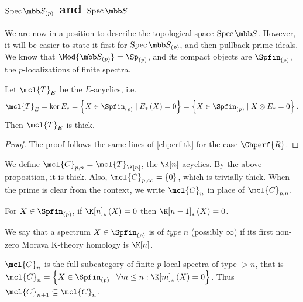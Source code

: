 \subsection{\texorpdfstring{$\spec \SS_{\left(p\right)}$}{spec S(p)} and \texorpdfstring{$\spec \SS$}{spec S}}

We are now in a position to describe the topological space $\spec \SS$.
However, it will be easier to state it first for $\spec \SS_{\left(p\right)}$, and then pullback prime ideals.
We know that $\Mod{\SS_{\left(p\right)}} = \Sp_{\left(p\right)}$, and its compact objects are $\Spfin_{\left(p\right)}$, the $p$-localizations of finite spectra.

\begin{proposition}
	Let $\mcl{T}_E$ be the $E$-acyclics, i.e.
	$$
	\mcl{T}_E
	= \ker E_*
	= \left\{ X \in \Spfin_{\left(p\right)} \mid E_*\left(X\right)=0 \right\}
	= \left\{ X \in \Spfin_{\left(p\right)} \mid X \otimes E_*=0 \right\}.
	$$
	Then $\mcl{T}_E$ is thick.
\end{proposition}

\begin{proof}
	The proof follows the same lines of \ref{chperf-tk} for the case $\Chperf{R}$.
\end{proof}

\begin{definition}
	We define $\mcl{C}_{p, n} = \mcl{T}_{\K[n]}$, the $\K[n]$-acyclics.
	By the above proposition, it is thick.
	Also, $\mcl{C}_{p, \infty} = \left\{ 0\right\}$, which is trivially thick.
	When the prime is clear from the context, we write $\mcl{C}_n$ in place of $\mcl{C}_{p, n}$.
\end{definition}

\begin{proposition}
	For $X \in \Spfin_{\left(p\right)}$, if $\K[n]_*\left(X\right) = 0$ then $\K[n-1]_*\left(X\right) = 0$.
\end{proposition}

\begin{definition}
	We say that a spectrum $X \in \Spfin_{\left(p\right)}$ is of \emph{type} $n$ (possibly $\infty$) if its first non-zero Morava K-theory homology is $\K[n]$.
\end{definition}

\begin{corollary}
	$\mcl{C}_n$ is the full subcategory of finite $p$-local spectra of type $> n$, that is $\mcl{C}_n = \left\{ X \in \Spfin_{\left(p\right)} \mid \forall m \leq n: \K[m]_*\left(X\right) = 0 \right\}$.
	Thus $\mcl{C}_{n+1} \subseteq \mcl{C}_n$.
\end{corollary}

